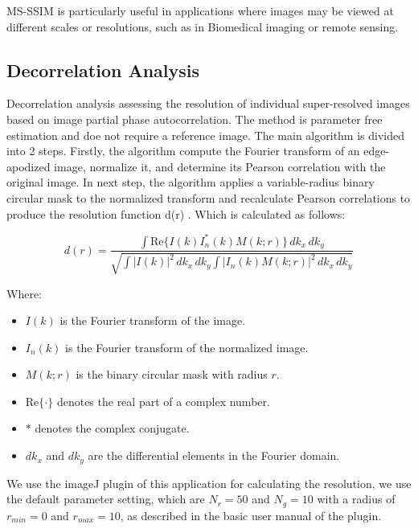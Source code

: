 \documentclass[11pt,
  paper=a4, 
  bibliography=totocnumbered,
	captions=tableheading,
	BCOR=10mm
]{scrreprt}
\theoremstyle{definition}
\begin{document}
\noindent
MS-SSIM is particularly useful in applications where images may be viewed at different scales or resolutions, such as in Biomedical imaging or remote sensing.


\subsection{Decorrelation Analysis}
\label{sec:decorrelation_analysis}



Decorrelation analysis assessing the resolution of individual super-resolved images based on image partial phase autocorrelation. 
The method is parameter free estimation and doe not require a reference image. The main algorithm is divided into 2 steps. 
Firstly, the algorithm compute the Fourier transform of an edge-apodized image, normalize it, and determine its Pearson correlation with the original image. 
In next step, the algorithm applies a variable-radius binary circular mask to the normalized transform and recalculate Pearson correlations 
to produce the resolution function d(r) .\cite{resolution_test} Which is calculated as follows:


\vspace{1cm}
\noindent

\begin{equation}
\label{eq:resolution}
	d(r) = \frac{\int \mathrm{Re}\{ I(k)I_n^*(k)M(k;r) \}\, dk_x\, dk_y}{\sqrt{\int |I(k)|^2\, dk_x\, dk_y \int |I_n(k)M(k;r)|^2\, dk_x\, dk_y}}
\end{equation}
	
	
Where:
\begin{itemize}
	\item \(I(k)\) is the Fourier transform of the image.
	\item \(I_n(k)\) is the Fourier transform of the normalized image.
	\item \(M(k;r)\) is the binary circular mask with radius \(r\).
	\item \(\mathrm{Re}\{\cdot\}\) denotes the real part of a complex number.
	\item \(*\) denotes the complex conjugate.
	\item \(dk_x\) and \(dk_y\) are the differential elements in the Fourier domain.

\end{itemize}


\vspace{1cm}
\noindent
We use the imageJ plugin of this application for calculating the resolution, we use the default parameter setting,
which are $N_r=50$ and $N_g=10$ with a radius of $r_{min}=0$ and $r_{max}=10$, as described in the basic user manual of the plugin. \cite{resolution_test}
\end{document}
